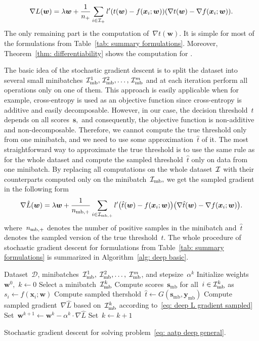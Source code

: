 \begin{equation}\label{eq: deep L gradient true}
  \nabla L(\bm{w})
    = \lambda \bm{w} + \frac{1}{\npos} \sum_{i \in \Ipos} l'\Brac{t(\bm{w}) - f(\bm{x}_i; \bm{w})}\Brac{\nabla t(\bm{w}) - \nabla f(\bm{x}_i; \bm{w})}.
\end{equation}
The only remaining part is the computation of~$\nabla t(\bm{w})$. It is simple for most of the formulations from Table~\ref{tab: summary formulations}. Moreover, Theorem~\ref{thm: differentiability} shows the computation for \PatMat.

The basic idea of the stochastic gradient descent is to split the dataset into several small minibatches~$\mathcal{I}_{\text{mb}}^1, \, \mathcal{I}_{\text{mb}}^2, \ldots, \, \mathcal{I}_{\text{mb}}^m$ and at each iteration perform all operations only on one of them. This approach is easily applicable when for example, cross-entropy is used as an objective function since cross-entropy is additive and easily decomposable. However, in our case, the decision threshold~$t$ depends on all scores~$\bm{s},$ and consequently, the objective function is non-additive and non-decomposable. Therefore, we cannot compute the true threshold only from one minibatch, and we need to use some approximation~$\hat{t}$ of it. The most straightforward way to approximate the true threshold is to use the same rule as for the whole dataset and compute the sampled threshold~$\hat{t}$ only on data from one minibatch. By replacing all computations on the whole dataset~$\mathcal{I}$ with their counterparts computed only on the minibatch~$\mathcal{I}_{\text{mb}},$ we get the sampled gradient in the following form
\begin{equation}\label{eq: deep L gradient sampled}
  \nabla \hat{L}(\bm{w})
    = \lambda \bm{w} + \frac{1}{\nmbpos} \sum_{i \in \Imbpos} l'\Brac{\hat{t}(\bm{w}) - f(\bm{x}_i; \bm{w})}\Brac{\nabla \hat{t}(\bm{w}) - \nabla f(\bm{x}_i; \bm{w})}.
\end{equation}
where~$n_{\text{mb},+}$ denotes the number of positive samples in the minibatch and~$\hat{t}$ denotes the sampled version of the true threshold~$t.$ The whole procedure of stochastic gradient descent for formulations from Table~\ref{tab: summary formulations} is summarized in Algorithm~\ref{alg: deep basic}.

\begin{algorithm}
  \centering
  \begin{algorithmic}[1]
    \Require Dataset~$\mathcal{D}$, minibatches~$\mathcal{I}_{\text{mb}}^1,\; \mathcal{I}_{\text{mb}}^2, \ldots, \; \mathcal{I}_{\text{mb}}^m$, and stepsize~$\alpha^k$
    \State Initialize weights~$\bm{w}^0,$ $k \gets 0$
    \Repeat
    \State Select a minibatch~$\mathcal{I}_{\text{mb}}^k$
    \State Compute scores~$\bm{s}_{\text{mb}}$ for all~$i \in \mathcal{I}_{\text{mb}}^k$ as~$s_i \gets f(\bm{x}_i; \bm{w})$ 
    \State Compute sampled thershold~$\hat{t} \gets G(\bm{s}_{\text{mb}}, \bm{y}_{\text{mb}})$
    \State Compute sampled gradient~$\nabla \hat{L}$ based on~$\mathcal{I}_{\text{mb}}^k$ according to~\eqref{eq: deep L gradient sampled}
    \State Set~$\bm{w}^{k+1} \gets \bm{w}^k - \alpha^k \cdot \nabla \hat{L}$
    \State Set~$k \gets k + 1$
  \end{algorithmic}
  \caption{Stochastic gradient descent for solving problem~\eqref{eq: aatp deep general}.}
  \label{alg: deep basic}
\end{algorithm}

